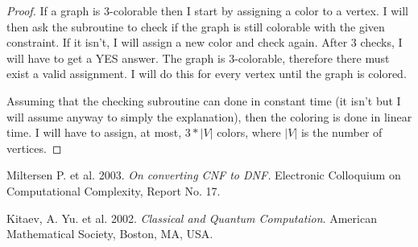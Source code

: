 \documentclass[letterpaper,11pt]{article}
\begin{document}
\begin{proof}
If a graph is 3-colorable then I start by assigning a color to a vertex.
I will then ask the subroutine to check if the graph is still colorable with the given constraint.
If it isn't, I will assign a new color and check again.
After 3 checks, I will have to get a {\sc YES} answer.
The graph is 3-colorable, therefore there must exist a valid assignment.
I will do this for every vertex until the graph is colored.

Assuming that the checking subroutine can done in constant time (it isn't but I will assume anyway to simply the explanation), then the coloring is done in linear time.
I will have to assign, at most, $3*|V|$ colors, where $|V|$ is the number of vertices.
\end{proof}

\begin{thebibliography}{1}

 Miltersen P. et al. 2003. {\em On converting CNF to DNF.} Electronic Colloquium on Computational Complexity, Report No. 17.

 Kitaev, A. Yu. et al. 2002. {\em Classical and Quantum Computation}. American Mathematical Society, Boston, MA, USA.


\end{thebibliography}
\end{document}
